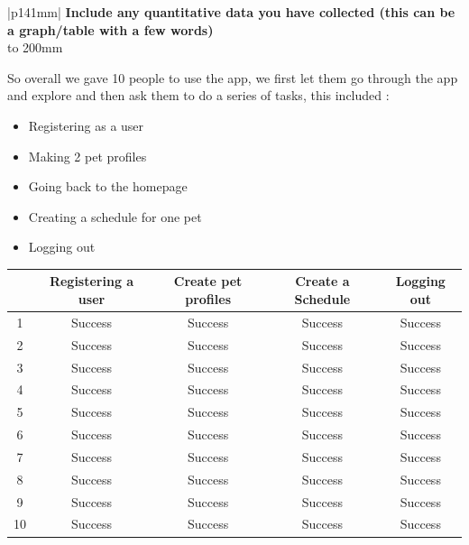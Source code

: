 \documentclass[a4paper]{article}
\newcommand{\colWidth}{141mm}
\begin{document}
\begin{center}
\begin{tabular}{|p{\colWidth}|}
	\hline
	\large
	\textbf{Include any quantitative data you have collected (this can be a graph/table with a few words)}
	\\ \hline
	\vtop to 200mm{
	\vspace{1mm}
	So overall we gave 10 people to use the app, we first let them go through the app and explore and then ask them to do a series of tasks, this included :
	\begin{itemize}
	    \item Registering as a user
	    \item Making 2 pet profiles 
	    \item Going back to the homepage
	    \item Creating a schedule for one pet 
	    \item Logging out 
	\end{itemize}
	\begin{center}
 \begin{tabular}{||c | c{3cm} | c{3cm} | c{3cm} | c{3cm}||} 
 \hline
  & Registering a user & Create pet profiles& Create a Schedule & Logging out \\ [0.5ex] 
 \hline\hline
 1 & Success  & Success& Success & Success  \\ 
 \hline
 2 & Success  & Success& Success & Success \\
 \hline
 3 & Success  & Success& Success & Success\\
 \hline
 4 & Success  & Success& Success & Success \\
 \hline
  5 & Success  & Success& Success & Success \\
  \hline
   6 & Success  & Success& Success & Success \\
  \hline
   7 & Success  & Success& Success & Success \\
  \hline
   8 & Success  & Success& Success & Success \\
  \hline
   9 & Success  & Success& Success & Success \\
  \hline
 10 & Success  & Success& Success & Success \\ [1ex] 
 \hline
\end{tabular}
\end{center}

  }
  \\
  \hline
\end{tabular}
\vskip 5mm


\end{center}
\end{document}
